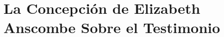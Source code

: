 \documentclass[./main.tex]{subfiles}
\begin{document}
\setcounter{chapter}{3}
\chapter{
La Concepción de Elizabeth Anscombe Sobre el Testimonio
}



%

%



%

%
\end{document}
